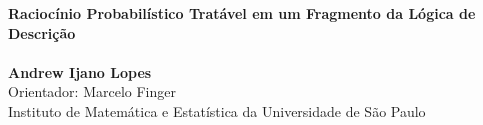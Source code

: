 \documentclass[portrait]{ppgcaposter}
\begin{document}
\selectfont
\renewcommand{\familydefault}{\sfdefault}
\renewcommand{\section}[2]{}

\begin{center}
    \textbf{\bf\veryHuge\color{NavyBlue}\selectfont Raciocínio Probabilístico Tratável em um Fragmento da Lógica de Descrição\\[1.5cm]}
    \Huge {}\\ [0.8cm]
    \huge \textbf{Andrew Ijano Lopes}\\ [0.8cm]
    \huge Orientador: Marcelo Finger\\ [0.2cm]
    \huge Instituto de Matemática e Estatística da Universidade de São Paulo
\end{center}

\vspace{1cm}

\Large
\end{document}
